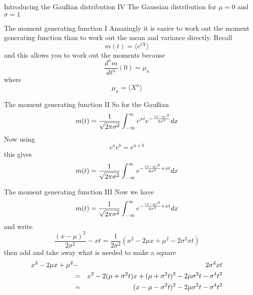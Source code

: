 \documentclass{beamer}
\begin{document}
\begin{frame}{Introducing the Gau\ss{}ian distribution IV}
The Gaussian distribution for \color{reddish}$\mu=0$\color{black}{} and \color{reddish}$\sigma=1$\color{black}{}
\begin{center}

\end{center}

\end{frame}


\begin{frame}{The moment generating function I}
Amazingly it is easier to work out the moment generating function than to work out the mean and variance directly. Recall
\color{reddish}
$$
m(t)=\langle e^{tX}\rangle
$$
\color{black}
and this allows you to work out the moments because
\color{reddish}
$$
\frac{d^nm}{dt^n}(0)=\mu_n
$$
\color{black}
where 
\color{reddish}
$$
\mu_n=\langle X^n\rangle
$$
\color{black}{}

\end{frame}



\begin{frame}{The moment generating function II}
So for the Gau\ss{}ian
\color{reddish}
$$
m(t)=\frac{1}{\sqrt{2\pi\sigma^2}}\int_{-\infty}^\infty \color{greenish}e^{xt}e^{-\frac{(x-\mu)^2}{2\sigma^2}}\color{reddish}dx
$$
\color{black}
Now using
\color{greenish}
$$
e^ae^b=e^{a+b}
$$
\color{black}
this gives 
\color{reddish}
$$
m(t)=\frac{1}{\sqrt{2\pi\sigma^2}}\int_{-\infty}^\infty \color{greenish}e^{-\frac{(x-\mu)^2}{2\sigma^2}+xt}\color{reddish}dx
$$

\end{frame}


\begin{frame}{The moment generating function III}
Now we have 
\color{reddish}
$$
m(t)=\frac{1}{\sqrt{2\pi\sigma^2}}\int_{-\infty}^\infty e^{\color{blueish}-\frac{(x-\mu)^2}{2\sigma^2}+xt\color{reddish}}dx
$$
\color{black}
and write
\color{blueish}{}
$$
\frac{(x-\mu)^2}{2\sigma^2}-xt=\frac{1}{2\sigma^2}(x^2-2\mu x +\mu^2-2\sigma^2 xt)
$$
\color{black}
then add and take away what is needed to make a square
\color{blueish}
\begin{eqnarray*}
x^2-2\mu x +\mu^2&-&2\sigma^2 xt\cr
 &=& x^2-2(\mu+\sigma^2 t) x +(\mu+\color{greenish}{}\sigma^2 t\color{blueish}{})^2\color{greenish}{} - 2\mu\sigma^2 t -\sigma^4 t^2\color{blueish}{}\cr
                                &=& (x-\mu-\sigma^2 t)^2 - 2\mu\sigma^2 t -\sigma^4 t^2
\end{eqnarray*}
\color{black}
\end{frame}
\end{document}
